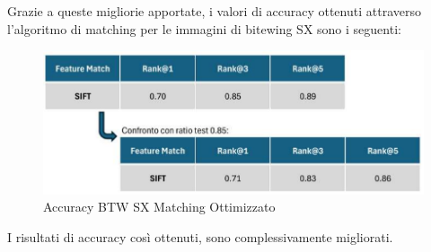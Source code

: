 \documentclass[12pt,a4paper,openright,twoside]{book}
\begin{document}
Grazie a queste migliorie apportate, i valori di accuracy ottenuti attraverso l'algoritmo di matching per le immagini di bitewing SX sono i seguenti:
\begin{figure}[H]
	\centering
	\includegraphics{figures/sx9_1.pdf}
    	\caption{Accuracy BTW SX Matching Ottimizzato}
	\label{fig:sx9}
\end{figure}
I risultati di accuracy così ottenuti, sono complessivamente migliorati.
\end{document}
